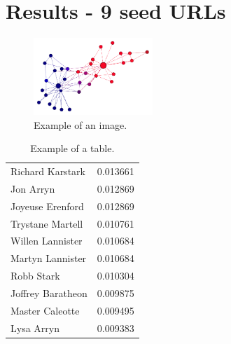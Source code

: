 \documentclass[9pt]{IEEEtran}
\begin{document}
\section{Results - 9 seed URLs}




\begin{figure}[h] \centering
	\includegraphics[width=0.4\textwidth]{karate.png}
	\caption{{Example of an image.}}
	\label{fig:karate}
\end{figure}


 
\begin{table}
    \begin{center}
    \caption{Example of a table.}
        \begin{tabular}{ l | r }
        
        Richard Karstark & 0.013661 \\
        Jon Arryn & 0.012869 \\
        Joyeuse Erenford & 0.012869 \\
        Trystane Martell & 0.010761 \\
        Willen Lannister & 0.010684 \\
        Martyn Lannister & 0.010684 \\
        Robb Stark & 0.010304 \\
        Joffrey Baratheon & 0.009875 \\
        Master Caleotte & 0.009495 \\
        Lysa Arryn & 0.009383 \\
        \end{tabular}
    \label{tab:pagerankGOT}
    \end{center}
\end{table}





\end{document}
